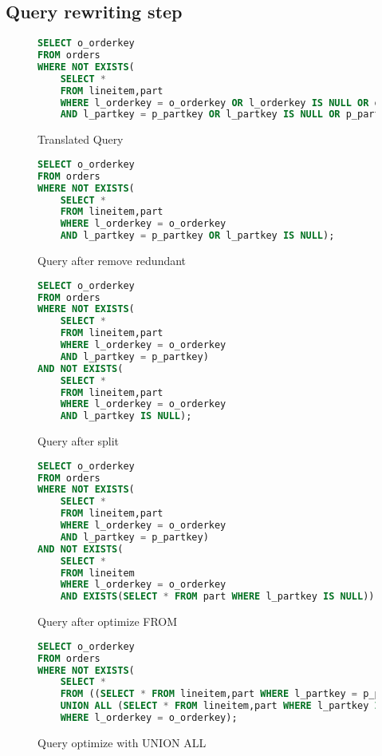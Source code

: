 \subsection{Query rewriting step}
\begin{figure}[H]
	\caption{\label{query_ex_1} Translated Query}
	\begin{lstlisting}[language=SQL]
SELECT o_orderkey
FROM orders
WHERE NOT EXISTS(
	SELECT *
	FROM lineitem,part
	WHERE l_orderkey = o_orderkey OR l_orderkey IS NULL OR o_orderkey IS NULL
	AND l_partkey = p_partkey OR l_partkey IS NULL OR p_partkey IS NULL);
	\end{lstlisting}
\end{figure}

\begin{figure}[H]
	\caption{\label{query_ex_2} Query after remove redundant}
	\begin{lstlisting}[language=SQL]
SELECT o_orderkey
FROM orders
WHERE NOT EXISTS(
	SELECT *
	FROM lineitem,part
	WHERE l_orderkey = o_orderkey
	AND l_partkey = p_partkey OR l_partkey IS NULL);
	\end{lstlisting}
\end{figure}

\begin{figure}[H]
	\caption{\label{query_ex_3} Query after split}
	\begin{lstlisting}[language=SQL]
SELECT o_orderkey
FROM orders
WHERE NOT EXISTS(
	SELECT *
	FROM lineitem,part
	WHERE l_orderkey = o_orderkey
	AND l_partkey = p_partkey)
AND NOT EXISTS(
	SELECT *
	FROM lineitem,part
	WHERE l_orderkey = o_orderkey
	AND l_partkey IS NULL);
	\end{lstlisting}
\end{figure}

\begin{figure}[H]
	\caption{\label{query_ex_4} Query after optimize FROM}
	\begin{lstlisting}[language=SQL]
SELECT o_orderkey
FROM orders
WHERE NOT EXISTS(
	SELECT *
	FROM lineitem,part
	WHERE l_orderkey = o_orderkey
	AND l_partkey = p_partkey)
AND NOT EXISTS(
	SELECT *
	FROM lineitem
	WHERE l_orderkey = o_orderkey
	AND EXISTS(SELECT * FROM part WHERE l_partkey IS NULL));
	\end{lstlisting}
\end{figure}

\begin{figure}[H]
	\caption{\label{query_ex_2} Query optimize with UNION ALL}
	\begin{lstlisting}[language=SQL]
SELECT o_orderkey
FROM orders
WHERE NOT EXISTS(
	SELECT *
	FROM ((SELECT * FROM lineitem,part WHERE l_partkey = p_partkey) 
	UNION ALL (SELECT * FROM lineitem,part WHERE l_partkey IS NULL)) as lp
	WHERE l_orderkey = o_orderkey);
	\end{lstlisting}
\end{figure}